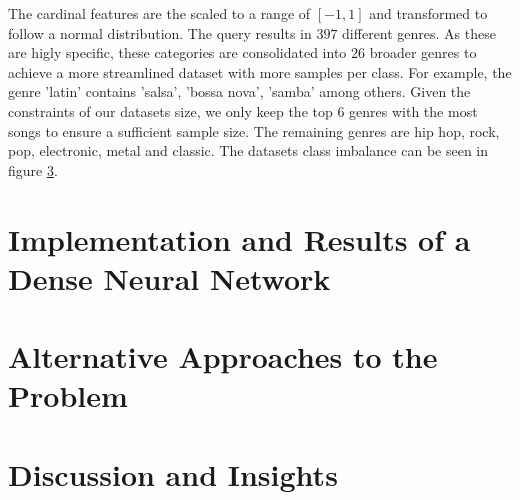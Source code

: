 \documentclass[
  12pt,
  bibliography=totoc,     %
  captions=tableheading,  %
  titlepage=firstiscover, %
]{scrartcl}
\begin{document}
\noindent
The cardinal features are the scaled to a range of $[-1,1]$ and transformed to follow a normal distribution.
The query results in $397$ different genres. As these are higly specific, these categories are consolidated into $26$ broader genres to
achieve a more streamlined dataset with more samples per class. For example, the genre 'latin' contains 'salsa', 'bossa nova', 'samba' among others.
Given the constraints of our datasets size, we only keep the top $6$ genres with the most songs to ensure a sufficient sample
size. The remaining genres are hip hop, rock, pop, electronic, metal and classic. The datasets class imbalance can be seen in figure \ref{}.
\section{Implementation and Results of a Dense Neural Network}

\section{Alternative Approaches to the Problem}

\section{Discussion and Insights}

\printbibliography
\end{document}
